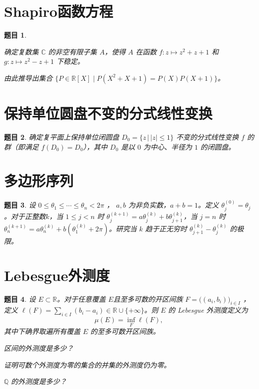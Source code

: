 \documentclass[12pt,UTF8]{ctexbook}
\theoremstyle{exercisestyle}
\newtheorem*{exercise}{题目}
\theoremstyle{solutionstyle}
\begin{document}
\section{Shapiro函数方程}
\begin{exercise}
  \begin{subquestions}
    \item 确定复数集 \(\mathbb{C}\) 的非空有限子集 \(A\)，使得 \(A\) 在函数 \(f: z \mapsto z^2 + z + 1\) 和 \(g: z \mapsto z^2 - z + 1\) 下稳定。
    \item 由此推导出集合 \(\{P \in \mathbb{R}[X] \mid P(X^2 + X + 1) = P(X)P(X + 1)\}\)。
  \end{subquestions}
\end{exercise}

\section{保持单位圆盘不变的分式线性变换}
\begin{exercise}
确定复平面上保持单位闭圆盘 \( D_0 = \{z \, | \, |z| \leqslant 1\}\) 不变的分式线性变换 \( f \) 的群（即满足 \( f(D_0) = D_0 \)），其中 \( D_0 \) 是以 \( 0 \) 为中心、半径为 \( 1 \) 的闭圆盘。
\end{exercise}

\section{多边形序列}
\begin{exercise}
设 \(0 \le \theta_1 \le \cdots \le \theta_n < 2\pi\) ， \(a, b\) 为非负实数，$a + b = 1$。定义 \(\theta_j^{(0)} = \theta_j\)。对于正整数$k$，当 \(1 \le j < n\) 时 \(\theta_j^{(k+1)} = a\theta_j^{(k)} + b\theta_{j+1}^{(k)}\)，当 \(j = n\) 时 \(\theta_n^{(k+1)} = a\theta_n^{(k)} + b(\theta_1^{(k)} + 2\pi)\)。研究当 \(k\) 趋于正无穷时 \(\theta_{j+1}^{(k)} - \theta_j^{(k)}\) 的极限。
\end{exercise}

\section{Lebesgue外测度}
\begin{exercise}
设 \(E \subset \mathbb{R}\)。对于任意覆盖 \(E\)且至多可数的开区间族 \(F = \bigl((a_i, b_i)\bigr)_{i \in I}\) ，定义 \(\ell(F) = \sum_{i \in I} (b_i - a_i) \in \mathbb{R} \cup \{+\infty\}\)。则 \(E\) 的 Lebesgue 外测度定义为
\[
\mu(E) = \inf_{F} \ell(F),
\]
其中下确界取遍所有覆盖 \(E\) 的至多可数开区间族。
\begin{subquestions}
\item 区间的外测度是多少？
\item 证明可数个外测度为零的集合的并集的外测度仍为零。
\item \(\mathbb{Q}\) 的外测度是多少？
\end{subquestions}
\end{exercise}
\end{document}
